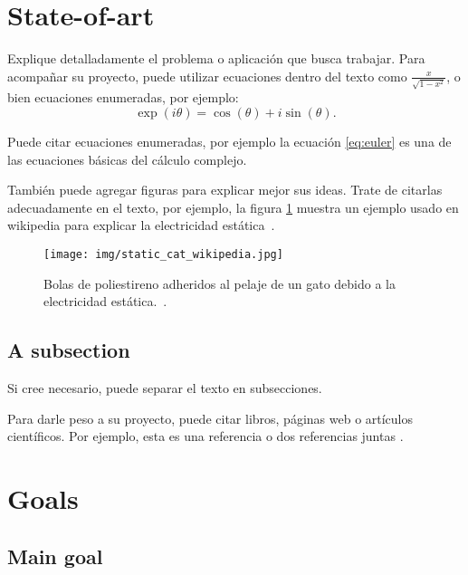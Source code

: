 \documentclass[demo, MAIN.tex]{subfiles}
\begin{document}
\section{State-of-art}

Explique detalladamente el problema o aplicación que busca
trabajar. Para acompañar su proyecto, puede utilizar ecuaciones dentro
del texto como $\frac{x}{\sqrt{1-x^2}}$, o bien ecuaciones enumeradas,
por ejemplo:
\begin{equation}\label{eq:euler}
\exp(i\theta) = \cos(\theta) + i\sin(\theta).
\end{equation}

Puede citar ecuaciones enumeradas, por ejemplo la ecuación
\eqref{eq:euler} es una de las ecuaciones básicas del cálculo
complejo.

También puede agregar figuras para explicar mejor sus ideas. Trate de
citarlas adecuadamente en el texto, por ejemplo, la figura
\ref{fig:figura-interesante} muestra un ejemplo usado en wikipedia
para explicar la electricidad estática~\cite{wikistatic}.

\begin{figure}[h!]
  \centering
  \texttt{[image: img/static\_cat\_wikipedia.jpg]}
  \caption{Bolas de poliestireno adheridos al pelaje de un gato debido
    a la electricidad estática.~\cite{wikistatic}.}
  \label{fig:figura-interesante}
\end{figure}

\subsection{A subsection}

Si cree necesario, puede separar el texto en subsecciones.

Para darle peso a su proyecto, puede citar libros, páginas web o artículos científicos. Por ejemplo, esta es una referencia 
\cite{AF:2003} o dos referencias juntas \cite{AF:2003, CEL:arXiv, MS}.

\section{Goals}

\subsection{Main goal}
\end{document}
